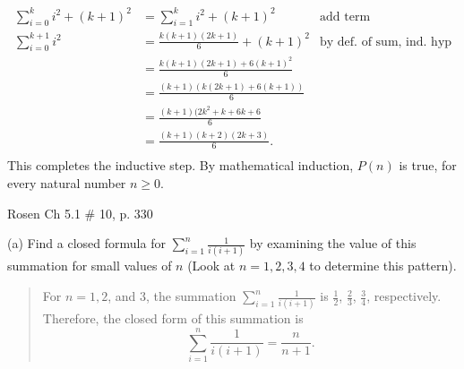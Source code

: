 \documentclass[12pt,addpoints]{exam}
\begin{document}
\begin{questions}
\begin{solution}
    \begin{align*}
        \sum_{i=0}^{k} i^2 + (k+1)^2 &= \sum_{i=1}^k i^2 + (k+1)^2   & \text{add term} \\
        \sum_{i=0}^{k+1} i^2 &= \frac{k(k+1)(2k+1)}{6} + (k+1)^2               & \text{by def. of sum, ind. hyp} \\
          &= \frac{k(k+1)(2k+1) +6(k+1)^2}{6}  \\
          &= \frac{(k+1)(k(2k+1) +6(k+1))}{6} \\
          &= \frac{(k+1)(2k^2 + k + 6k + 6}{6} \\
          &= \frac{(k+1)(k+2)(2k +3)}{6}. \\
    \end{align*}
    This completes the inductive step. By mathematical induction, $P(n)$ is true, for every natural number $n \geq 0$.
\end{solution}


\question Rosen Ch 5.1 \# 10, p. 330
    \ifprintanswers
        \vspace{-10pt}
   \fi
\begin{solution}
(a) Find a closed formula for $\displaystyle \sum_{i=1}^n \frac{1}{i(i+1)}$ by examining the value of this summation for small values of $n$ (Look at $n=1,2,3,4$ to determine this pattern).\\
\begin{quote}
    For $n=1,2$, and $3$, the summation $\displaystyle \sum_{i=1}^n \frac{1}{i(i+1)}$ is $\frac{1}{2}$, $\frac{2}{3}$, $\frac{3}{4}$, respectively.  Therefore, the closed form of this summation is
    \[ \sum_{i=1}^n \frac{1}{i(i+1)} = \frac{n}{n+1}. \]
\end{quote}


\end{solution}
\end{questions}
\end{document}
